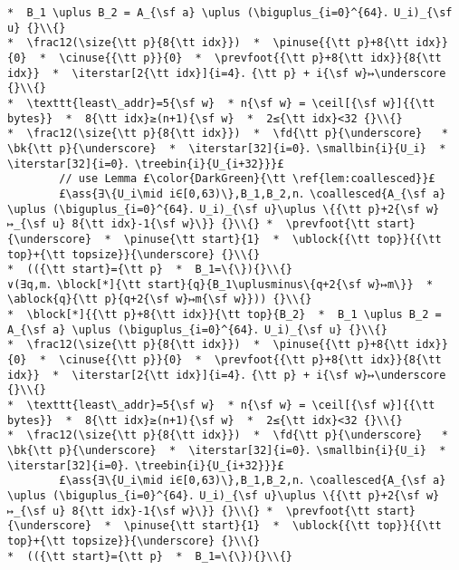 \documentclass[10pt,a4paper,twoside]{report}
\makeatletter
\newcommand{\ml}[2][t]{\mbox{\mdseries\begin{tabular}[#1]{@{}L@{}}#2\end{tabular}}}
\newcommand{\ass}[1]{\ensuremath{{\color{blue}\left\{\ml[c]{#1}\right\}}}}
\renewcommand{\ceil}[2][]{\left\lceil{#2}\right\rceil_{#1}}
\newcommand{\iterstar}[2][]{\text{\LARGE $*$}^{#1}_{#2}}
\makeatother
\begin{document}
\begin{lstlisting}
*  B_1 \uplus B_2 = A_{\sf a} \uplus (\biguplus_{i=0}^{64}．U_i)_{\sf u} {}\\{}
*  \frac12(\size{\tt p}{8{\tt idx}})  *  \pinuse{{\tt p}+8{\tt idx}}{0}  *  \cinuse{{\tt p}}{0}  *  \prevfoot{{\tt p}+8{\tt idx}}{8{\tt idx}}  *  \iterstar[2{\tt idx}]{i=4}．{\tt p} + i{\sf w}↦\underscore {}\\{}
*  \texttt{least\_addr}=5{\sf w}  * n{\sf w} = \ceil[{\sf w}]{{\tt bytes}}  *  8{\tt idx}≥(n+1){\sf w}  *  2≤{\tt idx}<32 {}\\{}
*  \frac12(\size{\tt p}{8{\tt idx}})  *  \fd{\tt p}{\underscore}   *  \bk{\tt p}{\underscore}  *  \iterstar[32]{i=0}．\smallbin{i}{U_i}  *  \iterstar[32]{i=0}．\treebin{i}{U_{i+32}}}£
        // use Lemma £\color{DarkGreen}{\tt \ref{lem:coallesced}}£ 
        £\ass{∃\{U_i\mid i∈[0,63)\},B_1,B_2,n．\coallesced{A_{\sf a} \uplus (\biguplus_{i=0}^{64}．U_i)_{\sf u}\uplus \{{\tt p}+2{\sf w}↦_{\sf u} 8{\tt idx}-1{\sf w}\}} {}\\{} *  \prevfoot{\tt start}{\underscore}  *  \pinuse{\tt start}{1}  *  \ublock{{\tt top}}{{\tt top}+{\tt topsize}}{\underscore} {}\\{}
*  (({\tt start}={\tt p}  *  B_1=\{\}){}\\{}
∨(∃q,m．\block[*]{\tt start}{q}{B_1\uplusminus\{q+2{\sf w}↦m\}}  *  \ablock{q}{\tt p}{q+2{\sf w}↦m{\sf w}})) {}\\{}
*  \block[*]{{\tt p}+8{\tt idx}}{\tt top}{B_2}  *  B_1 \uplus B_2 = A_{\sf a} \uplus (\biguplus_{i=0}^{64}．U_i)_{\sf u} {}\\{}
*  \frac12(\size{\tt p}{8{\tt idx}})  *  \pinuse{{\tt p}+8{\tt idx}}{0}  *  \cinuse{{\tt p}}{0}  *  \prevfoot{{\tt p}+8{\tt idx}}{8{\tt idx}}  *  \iterstar[2{\tt idx}]{i=4}．{\tt p} + i{\sf w}↦\underscore {}\\{}
*  \texttt{least\_addr}=5{\sf w}  * n{\sf w} = \ceil[{\sf w}]{{\tt bytes}}  *  8{\tt idx}≥(n+1){\sf w}  *  2≤{\tt idx}<32 {}\\{}
*  \frac12(\size{\tt p}{8{\tt idx}})  *  \fd{\tt p}{\underscore}   *  \bk{\tt p}{\underscore}  *  \iterstar[32]{i=0}．\smallbin{i}{U_i}  *  \iterstar[32]{i=0}．\treebin{i}{U_{i+32}}}£ 
        £\ass{∃\{U_i\mid i∈[0,63)\},B_1,B_2,n．\coallesced{A_{\sf a} \uplus (\biguplus_{i=0}^{64}．U_i)_{\sf u}\uplus \{{\tt p}+2{\sf w}↦_{\sf u} 8{\tt idx}-1{\sf w}\}} {}\\{} *  \prevfoot{\tt start}{\underscore}  *  \pinuse{\tt start}{1}  *  \ublock{{\tt top}}{{\tt top}+{\tt topsize}}{\underscore} {}\\{}
*  (({\tt start}={\tt p}  *  B_1=\{\}){}\\{}

\end{lstlisting}
\end{document}
